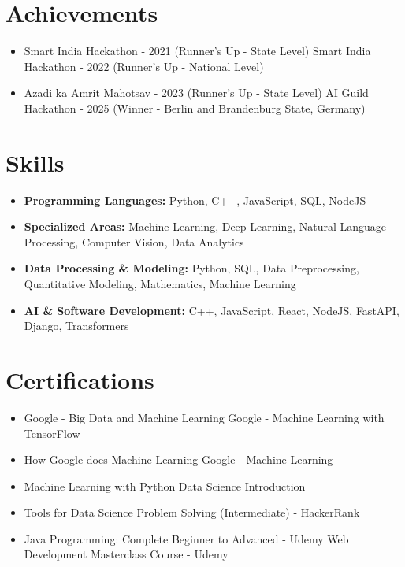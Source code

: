 \documentclass[a4paper,10pt]{article}
\begin{document}
\section*{Achievements}
\begin{itemize}
\item Smart India Hackathon - 2021 (Runner's Up - State Level) \hfill Smart India Hackathon - 2022 (Runner's Up - National Level)
\item Azadi ka Amrit Mahotsav - 2023 (Runner's Up - State Level) \hfill AI Guild Hackathon - 2025 (Winner - Berlin and Brandenburg State, Germany)
\end{itemize}

\section*{Skills}
\begin{itemize}
  \item \textbf{Programming Languages:} Python, C++, JavaScript, SQL, NodeJS
  \item \textbf{Specialized Areas:} Machine Learning, Deep Learning, Natural Language Processing, Computer Vision, Data Analytics
  \item \textbf{Data Processing \& Modeling:} Python, SQL, Data Preprocessing, Quantitative Modeling, Mathematics, Machine Learning
  \item \textbf{AI \& Software Development:} C++, JavaScript, React, NodeJS, FastAPI, Django, Transformers
\end{itemize}

\section*{Certifications}
\begin{itemize}
\item Google - Big Data and Machine Learning \hfill Google - Machine Learning with TensorFlow
\item How Google does Machine Learning \hfill Google - Machine Learning
\item Machine Learning with Python \hfill Data Science Introduction
\item Tools for Data Science \hfill Problem Solving (Intermediate) - HackerRank
\item Java Programming: Complete Beginner to Advanced - Udemy \hfill Web Development Masterclass Course - Udemy
\end{itemize}
\end{document}
